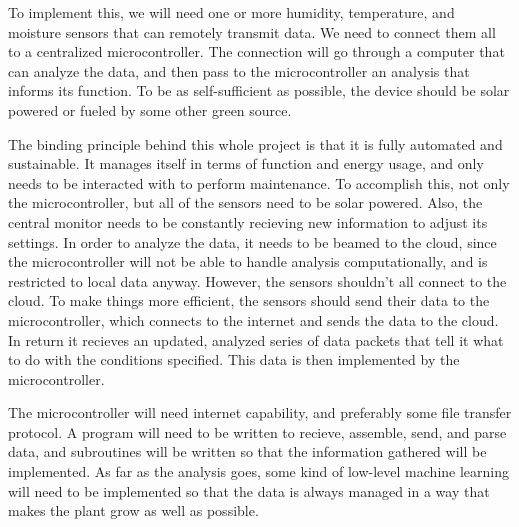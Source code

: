\documentclass[letterpaper, 10pt, fleqn]{article}
\begin{document}
To implement this, we will need one or more humidity, temperature, and moisture sensors that can remotely transmit data. We need to connect them all to a centralized microcontroller. The connection will go through a computer that can analyze the data, and then pass to the microcontroller an analysis that informs its function. To be as self-sufficient as possible, the device should be solar powered or fueled by some other green source. 

	The binding principle behind this whole project is that it is fully automated and sustainable. It manages itself in terms of function and energy usage, and only needs to be interacted with to perform maintenance. To accomplish this, not only the microcontroller, but all of the sensors need to be solar powered. Also, the central monitor needs to be constantly recieving new information to adjust its settings. In order to analyze the data, it needs to be beamed to the cloud, since the microcontroller will not be able to handle analysis computationally, and is restricted to local data anyway. However, the sensors shouldn't all connect to the cloud. To make things more efficient, the sensors should send their data to the microcontroller, which connects to the internet and sends the data to the cloud. In return it recieves an updated, analyzed series of data packets that tell it what to do with the conditions specified. This data is then implemented by the microcontroller. 

	The microcontroller will need internet capability, and preferably some file transfer protocol. A program will need to be written to recieve, assemble, send, and parse data, and subroutines will be written so that the information gathered will be implemented. As far as the analysis goes, some kind of low-level machine learning will need to be implemented so that the data is always managed in a way that makes the plant grow as well as possible. 
\end{document}
